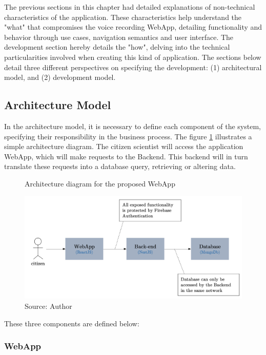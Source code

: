 The previous sections in this chapter had detailed explanations of non-technical characteristics of the application. These characteristics help understand the "what" that compromises the voice recording WebApp, detailing functionality and behavior through use cases, navigation semantics and user interface. The development section hereby details the "how", delving into the technical particularities involved when creating this kind of application. The sections below detail three different perspectives on specifying the development: (1) architectural model, and (2) development model.

\subsection{Architecture Model}

In the architecture model, it is necessary to define each component of the system, specifying their responsibility in the business process. The figure \ref{fig:webapp-architecture} illustrates a simple architecture diagram. The citizen scientist will access the application WebApp, which will make requests to the Backend. This backend will in turn translate these requests into a database query, retrieving or altering data.

\begin{figure}[h]
    \centering
    \caption{Architecture diagram for the proposed WebApp}
    \label{fig:webapp-architecture}
    \includegraphics[width=\linewidth]{images/sw-req-spec/architecture.png}
    \caption*{Source: Author}
\end{figure}

These three components are defined below:

\subsubsection{WebApp}

